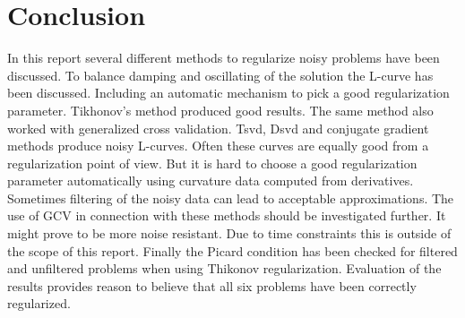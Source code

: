 \section{Conclusion}
In this report several different methods to regularize noisy problems have been discussed. To balance damping and oscillating of the solution the L-curve has been discussed. Including an automatic mechanism to pick a good regularization parameter. Tikhonov's method produced good results. The same method also worked with generalized cross validation. Tsvd, Dsvd and conjugate gradient methods produce noisy L-curves. Often these curves are equally good from a regularization point of view. But it is hard to choose a good regularization parameter automatically using curvature data computed from derivatives. Sometimes filtering of the noisy data can lead to acceptable approximations. The use of GCV in connection with these methods should be investigated further. It might prove to be more noise resistant. Due to time constraints this is outside of the scope of this report. Finally the Picard condition has been checked for filtered and unfiltered problems when using Thikonov regularization. Evaluation of the results provides reason to believe that all six problems have been correctly regularized.  